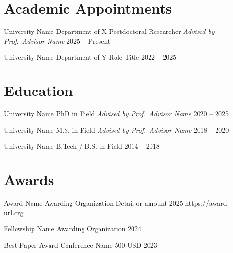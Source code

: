 \documentclass{long-CV}
\begin{document}
\maketitle

\section{Academic Appointments}

\cventry
  {University Name}
  {Department of X}
  {Postdoctoral Researcher \enspace\textbar\enspace \textit{Advised by Prof.\ Advisor Name}}
  {2025 -- Present}

\cventry
  {University Name}
  {Department of Y}
  {Role Title}
  {2022 -- 2025}

\section{Education}

\cvedu
  {University Name}
  {PhD in Field \enspace\textbar\enspace \textit{Advised by Prof.\ Advisor Name}}
  {2020 -- 2025}

\cvedu
  {University Name}
  {M.S. in Field \enspace\textbar\enspace \textit{Advised by Prof.\ Advisor Name}}
  {2018 -- 2020}

\cvedu
  {University Name}
  {B.Tech / B.S. in Field}
  {2014 -- 2018}

\section{Awards}

\cvaward
  {Award Name}
  {Awarding Organization}
  {Detail or amount}
  {2025}
  {https://award-url.org}

\cvaward
  {Fellowship Name}
  {Awarding Organization}
  {}
  {2024}
  {}

\cvaward
  {Best Paper Award}
  {Conference Name}
  {500 USD}
  {2023}
  {}

\end{document}

